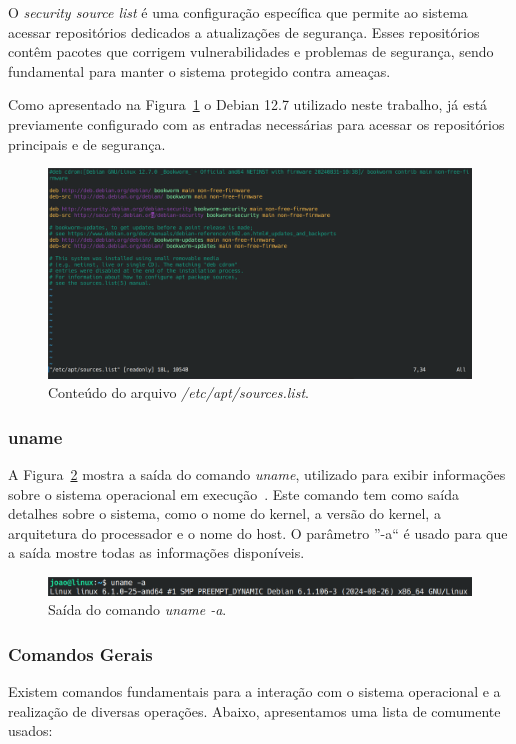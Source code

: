 \documentclass[
	12pt,				%
	oneside,   	        %
	a4paper,			%
	english,			%
	french,				%
	spanish,			%
	brazil,				%
	]{pacotes/abntex2}
\begin{document}
O \textit{security source list} é uma configuração específica que permite ao sistema acessar repositórios dedicados a atualizações de segurança. Esses repositórios contêm pacotes que corrigem vulnerabilidades e problemas de segurança, sendo fundamental para manter o sistema protegido contra ameaças. 

Como apresentado na Figura~\ref{fig:sources} o Debian 12.7 utilizado neste trabalho, já está previamente configurado com as entradas necessárias para acessar os repositórios principais e de segurança.

\begin{figure}[H]
  \centering
  \includegraphics[scale=0.3]{figuras/source_list.png}
  \caption{Conteúdo do arquivo \textit{/etc/apt/sources.list}.}
  \label{fig:sources}
\end{figure}

\subsubsection{uname}
A Figura~\ref{fig:uname} mostra a saída do comando \textit{uname}, utilizado para exibir informações sobre o sistema operacional em execução~\cite{manUname}. Este comando tem como saída detalhes sobre o sistema, como o nome do kernel, a versão do kernel, a arquitetura do processador e o nome do host. O parâmetro ''-a`` é usado para que a saída mostre todas as informações disponíveis.

\begin{figure}[H]
  \centering
  \includegraphics[scale=0.43]{figuras/uname.png}
  \caption{Saída do comando \textit{uname -a}.}
  \label{fig:uname}
\end{figure}

\subsubsection{Comandos Gerais}
Existem comandos fundamentais para a interação com o sistema operacional e a realização de diversas operações. Abaixo, apresentamos uma lista de comumente usados:
\end{document}

